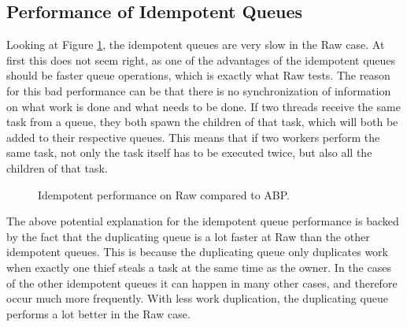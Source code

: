 \subsection{Performance of Idempotent Queues}
Looking at Figure \ref{fig:idemraw}, the idempotent queues are very slow in the Raw case. At first this does not seem right, as one of the advantages of the idempotent queues should be faster queue operations, which is exactly what Raw tests. The reason for this bad performance can be that there is no synchronization of information on what work is done and what needs to be done. If two threads receive the same task from a queue, they both spawn the children of that task, which will both be added to their respective queues. This means that if two workers perform the same task, not only the task itself has to be executed twice, but also all the children of that task.

\begin{figure}
\caption{Idempotent performance on Raw compared to ABP.}
\label{fig:idemraw}
\end{figure}

The above potential explanation for the idempotent queue performance is backed by the fact that the duplicating queue is a lot faster at Raw than the other idempotent queues. This is because the duplicating queue only duplicates work when exactly one thief steals a task at the same time as the owner. In the cases of the other idempotent queues it can happen in many other cases, and therefore occur much more frequently. With less work duplication, the duplicating queue performs a lot better in the Raw case.